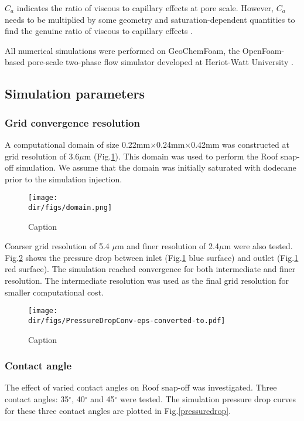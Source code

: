 $C_a$ indicates the ratio of viscous to capillary effects at pore scale. However, $C_a$ needs to be multiplied by some geometry and saturation-dependent quantities to find the genuine ratio of viscous to capillary effects \citep{blunt2017multiphase}.

All numerical simulations were performed on GeoChemFoam, the OpenFoam-based \citep{weller1998tensorial} pore-scale two-phase flow simulator developed at Heriot-Watt University \citep{Geochemfoam}.

\subsection{Simulation parameters}
\subsubsection{Grid convergence resolution}
A computational domain of size 0.22mm$\times$0.24mm$\times$0.42mm was constructed at grid resolution of 3.6$\mu$m (Fig.\ref{domain}). This domain was used to perform the Roof snap-off simulation. We assume that the domain was initially saturated with dodecane prior to the simulation injection. 

\begin{figure}
    \centering
    \texttt{[image: \\dir/figs/domain.png]}
    \caption{Caption}   
    \label{domain}
\end{figure}

Coarser grid resolution of 5.4 $\mu$m and finer resolution of 2.4$\mu$m were also tested. Fig.\ref{pressuredropconv} shows the pressure drop between inlet (Fig.\ref{domain} blue surface) and outlet (Fig.\ref{domain} red surface). The simulation reached convergence for both intermediate and finer resolution. The intermediate resolution was used as the final grid resolution for smaller computational cost.

\begin{figure}
    \centering
    \texttt{[image: \\dir/figs/PressureDropConv-eps-converted-to.pdf]}
    \caption{Caption}   
    \label{pressuredropconv}
\end{figure}

\subsubsection{Contact angle}
The effect of varied contact angles on Roof snap-off was investigated. Three contact angles: 35$^\circ$, 40$^\circ$ and 45$^\circ$ were tested. The simulation pressure drop curves for these three contact angles are plotted in Fig.\ref{pressuredrop}.

